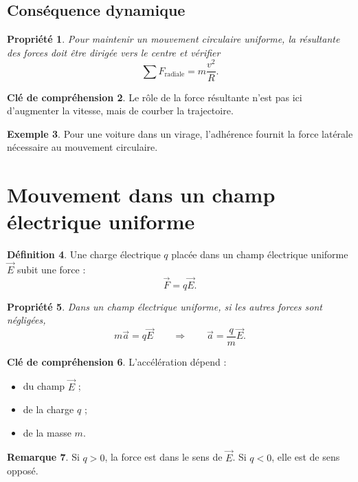 \documentclass[11pt,a4paper]{article}
\theoremstyle{definition}
\newtheorem{definition}{Définition}[section]
\newtheorem{exemple}[definition]{Exemple}
\newtheorem{remarque}[definition]{Remarque}
\newtheorem{interpretation}[definition]{Clé de compréhension}
\theoremstyle{plain}
\newtheorem{propriete}[definition]{Propriété}
\theoremstyle{remark}
\begin{document}
\subsection{Conséquence dynamique}

\begin{propriete}
Pour maintenir un mouvement circulaire uniforme, la résultante des forces doit être dirigée vers le centre et vérifier
\[
\sum F_{\text{radiale}}=m\frac{v^2}{R}.
\]
\end{propriete}

\begin{interpretation}
Le rôle de la force résultante n'est pas ici d'augmenter la vitesse, mais de courber la trajectoire.
\end{interpretation}

\begin{exemple}
Pour une voiture dans un virage, l'adhérence fournit la force latérale nécessaire au mouvement circulaire.
\end{exemple}

\section{Mouvement dans un champ électrique uniforme}

\begin{definition}
Une charge électrique $q$ placée dans un champ électrique uniforme $\vec{E}$ subit une force :
\[
\vec{F}=q\vec{E}.
\]
\end{definition}

\begin{propriete}
Dans un champ électrique uniforme, si les autres forces sont négligées,
\[
m\vec{a}=q\vec{E}
\qquad \Longrightarrow \qquad
\vec{a}=\frac{q}{m}\vec{E}.
\]
\end{propriete}

\begin{interpretation}
L'accélération dépend :
\begin{itemize}
    \item du champ $\vec{E}$ ;
    \item de la charge $q$ ;
    \item de la masse $m$.
\end{itemize}
\end{interpretation}

\begin{remarque}
Si $q>0$, la force est dans le sens de $\vec{E}$.  
Si $q<0$, elle est de sens opposé.
\end{remarque}
\end{document}

